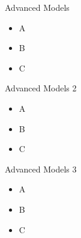 \begin{frame}{Advanced Models}
    \begin{itemize}
        \item A
        \item B
        \item C
    \end{itemize}
\end{frame}

\begin{frame}{Advanced Models 2}
    \begin{itemize}
        \item A
        \item B
        \item C
    \end{itemize}
\end{frame}

\begin{frame}{Advanced Models 3}
    \begin{itemize}
        \item A
        \item B
        \item C
    \end{itemize}
\end{frame}